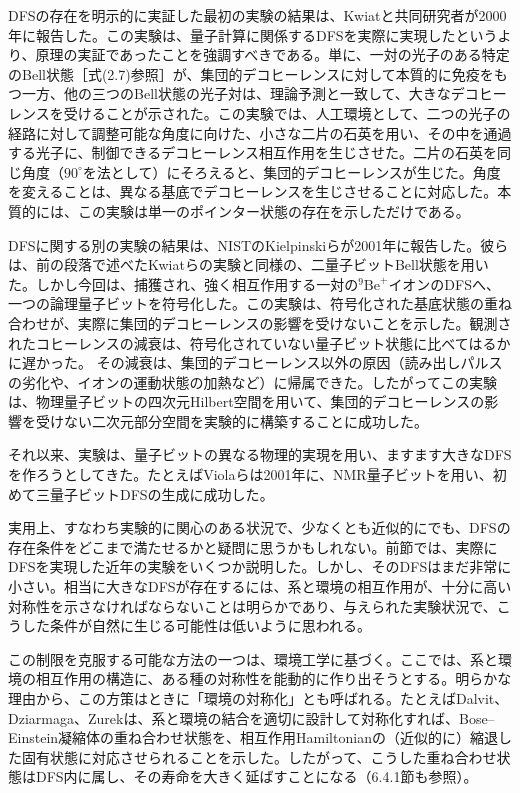 DFSの存在を明示的に実証した最初の実験の結果は、Kwiatと共同研究者が2000年に報告した\cite{ref374}。この実験は、量子計算に関係するDFSを実際に実現したというより、原理の実証であったことを強調すべきである。単に、一対の光子のある特定のBell状態［式(2.7)参照］が、集団的デコヒーレンスに対して本質的に免疫をもつ一方、他の三つのBell状態の光子対は、理論予測と一致して、大きなデコヒーレンスを受けることが示された。この実験では、人工環境として、二つの光子の経路に対して調整可能な角度に向けた、小さな二片の石英を用い、その中を通過する光子に、制御できるデコヒーレンス相互作用を生じさせた。二片の石英を同じ角度（$90^\circ$を法として）にそろえると、集団的デコヒーレンスが生じた。角度を変えることは、異なる基底でデコヒーレンスを生じさせることに対応した。本質的には、この実験は単一のポインター状態の存在を示しただけである。

DFSに関する別の実験の結果は、NISTのKielpinskiらが2001年に報告した\cite{ref375}。彼らは、前の段落で述べたKwiatらの実験\cite{ref374}と同様の、二量子ビットBell状態を用いた。しかし今回は、捕獲され、強く相互作用する一対の$^9\mathrm{Be}^+$イオンのDFSへ、一つの論理量子ビットを符号化した。この実験は、符号化された基底状態の重ね合わせが、実際に集団的デコヒーレンスの影響を受けないことを示した。観測されたコヒーレンスの減衰は、符号化されていない量子ビット状態に比べてはるかに遅かった。
\hypertarget{srcpage:326}{}\label{srcpage:326}
その減衰は、集団的デコヒーレンス以外の原因（読み出しパルスの劣化や、イオンの運動状態の加熱など）に帰属できた。したがってこの実験は、物理量子ビットの四次元Hilbert空間を用いて、集団的デコヒーレンスの影響を受けない二次元部分空間を実験的に構築することに成功した。

それ以来、実験は、量子ビットの異なる物理的実現を用い、ますます大きなDFSを作ろうとしてきた。たとえばViolaらは2001年に、NMR量子ビットを用い、初めて三量子ビットDFSの生成に成功した\cite{ref376}。

実用上、すなわち実験的に関心のある状況で、少なくとも近似的にでも、DFSの存在条件をどこまで満たせるかと疑問に思うかもしれない。前節では、実際にDFSを実現した近年の実験をいくつか説明した。しかし、そのDFSはまだ非常に小さい。相当に大きなDFSが存在するには、系と環境の相互作用が、十分に高い対称性を示さなければならないことは明らかであり、与えられた実験状況で、こうした条件が自然に生じる可能性は低いように思われる。

この制限を克服する可能な方法の一つは、環境工学に基づく。ここでは、系と環境の相互作用の構造に、ある種の対称性を能動的に作り出そうとする。明らかな理由から、この方策はときに「環境の対称化」とも呼ばれる。たとえばDalvit、Dziarmaga、Zurek\cite{ref102}は、系と環境の結合を適切に設計して対称化すれば、Bose--Einstein凝縮体の重ね合わせ状態を、相互作用Hamiltonianの（近似的に）縮退した固有状態に対応させられることを示した。したがって、こうした重ね合わせ状態はDFS内に属し、その寿命を大きく延ばすことになる（6.4.1節も参照）。

